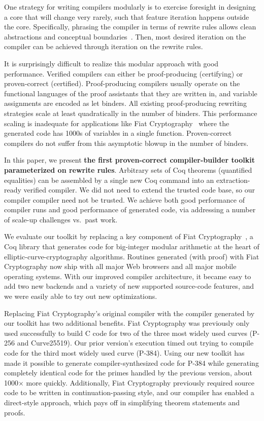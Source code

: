 \documentclass[a4paper,USenglish,cleveref,autoref,thm-restate]{lipics-v2021}
\begin{document}
One strategy for writing compilers modularly is to exercise foresight in designing a core that will change very rarely, such that feature iteration happens outside the core.
Specifically, phrasing the compiler in terms of rewrite rules allows clean abstractions and conceptual boundaries~\cite{Hickey2006}.
Then, most desired iteration on the compiler can be achieved through iteration on the rewrite rules.

It is surprisingly difficult to realize this modular approach with good performance.
Verified compilers can either be proof-producing (certifying) or proven-correct (certified).
Proof-producing compilers usually operate on the functional languages of the proof assistants that they are written in, and variable assignments are encoded as let binders.
All existing proof-producing rewriting strategies scale at least quadratically in the number of binders.
This performance scaling is inadequate for applications like Fiat Cryptography~\cite{FiatCryptoSP19} where the generated code has 1000s of variables in a single function.
Proven-correct compilers do not suffer from this asymptotic blowup in the number of binders.

In this paper, we present \textbf{the first proven-correct compiler-builder toolkit parameterized on rewrite rules}.
Arbitrary sets of Coq theorems (quantified equalities) can be assembled by a single new Coq command into an extraction-ready verified compiler.
We did not need to extend the trusted code base, so our compiler compiler need not be trusted.
We achieve both good performance of compiler runs and good performance of generated code, via addressing a number of scale-up challenges vs.\ past work.

We evaluate our toolkit by replacing a key component of Fiat Cryptography~\cite{FiatCryptoSP19}, a Coq library that generates code for big-integer modular arithmetic at the heart of elliptic-curve-cryptography algorithms.
Routines generated (with proof) with Fiat Cryptography now ship with all major Web browsers and all major mobile operating systems.
With our improved compiler architecture, it became easy to add two new backends and a variety of new supported source-code features, and we were easily able to try out new optimizations.

Replacing Fiat Cryptography's original compiler with the compiler generated by our toolkit has two additional benefits.
Fiat Cryptography was previously only used successfully to build C code for two of the three most widely used curves (P-256 and Curve25519).
Our prior version's execution timed out trying to compile code for the third most widely used curve (P-384).
Using our new toolkit has made it possible to generate compiler-synthesized code for P-384 while generating completely identical code for the primes handled by the previous version, about 1000$\times$ more quickly.
Additionally, Fiat Cryptography previously required source code to be written in continuation-passing style, and our compiler has enabled a direct-style approach, which pays off in simplifying theorem statements and proofs.
\end{document}
